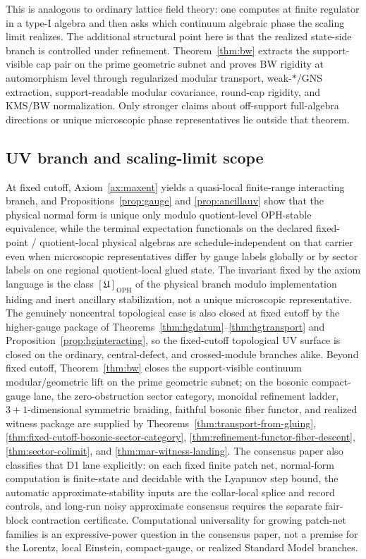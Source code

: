 \documentclass[11pt]{article}
\begin{document}
This is analogous to ordinary lattice field theory: one computes at finite regulator in a type-I algebra and then asks which continuum algebraic phase the scaling limit realizes. The additional structural point here is that the realized state-side branch is controlled under refinement. Theorem~\ref{thm:bw} extracts the support-visible cap pair on the prime geometric subnet and proves BW rigidity at automorphism level through regularized modular transport, weak-\(*\)/GNS extraction, support-readable modular covariance, round-cap rigidity, and KMS/BW normalization. Only stronger claims about off-support full-algebra directions or unique microscopic phase representatives lie outside that theorem.
\subsection{UV branch and scaling-limit scope}

At fixed cutoff, Axiom~\ref{ax:maxent} yields a quasi-local finite-range interacting branch, and Propositions~\ref{prop:gauge} and \ref{prop:ancillauv} show that the physical normal form is unique only modulo quotient-level OPH-stable equivalence, while the terminal expectation functionals on the declared fixed-point / quotient-local physical algebras are schedule-independent on that carrier even when microscopic representatives differ by gauge labels globally or by sector labels on one regional quotient-local glued state. The invariant fixed by the axiom language is the class \([\mathfrak U]_{\mathrm{OPH}}\) of the physical branch modulo implementation hiding and inert ancillary stabilization, not a unique microscopic representative. The genuinely noncentral topological case is also closed at fixed cutoff by the higher-gauge package of Theorems~\ref{thm:hgdatum}--\ref{thm:hgtransport} and Proposition~\ref{prop:hginteracting}, so the fixed-cutoff topological UV surface is closed on the ordinary, central-defect, and crossed-module branches alike. Beyond fixed cutoff, Theorem~\ref{thm:bw} closes the support-visible continuum modular/geometric lift on the prime geometric subnet; on the bosonic compact-gauge lane, the zero-obstruction sector category, monoidal refinement ladder, \(3+1\)-dimensional symmetric braiding, faithful bosonic fiber functor, and realized witness package are supplied by Theorems~\ref{thm:transport-from-gluing}, \ref{thm:fixed-cutoff-bosonic-sector-category}, \ref{thm:refinement-functor-fiber-descent}, \ref{thm:sector-colimit}, and \ref{thm:mar-witness-landing}.
The consensus paper also classifies that D1 lane explicitly: on each fixed finite patch net,
normal-form computation is finite-state and decidable with the Lyapunov step bound, the
automatic approximate-stability inputs are the collar-local splice and record controls, and
long-run noisy approximate consensus requires the separate fair-block contraction certificate.
Computational universality for growing patch-net families is an expressive-power question in the
consensus paper, not a premise for the Lorentz, local Einstein, compact-gauge, or realized
Standard Model branches.
\end{document}
